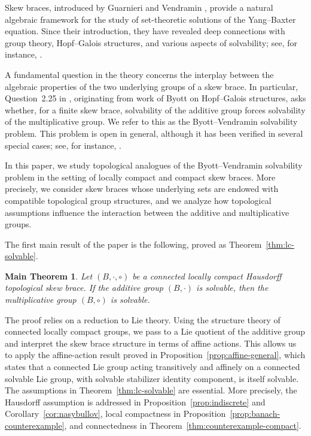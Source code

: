 \documentclass[reqno]{amsart}
\numberwithin{equation}{section}
\newtheorem*{maintheorem}{Main Theorem}
\theoremstyle{definition}
\theoremstyle{remark}
\begin{document}
Skew braces, introduced by Guarnieri and Vendramin \cite{Guarnieri2017},
provide a natural algebraic framework for the study of set-theoretic solutions
of the Yang--Baxter equation. Since their introduction, they have revealed deep
connections with group theory, Hopf--Galois structures, and various aspects of
solvability; see, for instance, \cite{Smoktunowicz2018,Nasybullov}.

A fundamental question in the theory concerns the interplay between the
algebraic properties of the two underlying groups of a skew brace. In
particular, Question~2.25 in \cite{Smoktunowicz2018}, originating from work of
Byott on Hopf--Galois structures, asks whether, for a finite skew brace,
solvability of the additive group forces solvability of the multiplicative
group. We refer to this as the Byott--Vendramin solvability problem. This
problem is open in general, although it has been verified in several special
cases; see, for instance, \cite{Nasybullov,GorshkovNasybullov}.

In this paper, we study topological analogues of the Byott--Vendramin
solvability problem in the setting of locally compact and compact skew braces.
More precisely, we consider skew braces whose underlying sets are endowed with
compatible topological group structures, and we analyze how topological
assumptions influence the interaction between the additive and multiplicative
groups.

The first main result of the paper is the following, proved as
Theorem~\ref{thm:lc-solvable}.

\begin{maintheorem}
Let $(B,\cdot,\circ)$ be a connected locally compact Hausdorff topological skew
brace. If the additive group $(B,\cdot)$ is solvable, then the multiplicative
group $(B,\circ)$ is solvable.
\end{maintheorem}

The proof relies on a reduction to Lie theory. Using the structure theory of
connected locally compact groups, we pass to a Lie quotient of the additive
group and interpret the skew brace structure in terms of affine actions. 
This allows us to apply the affine-action result proved in
Proposition~\ref{prop:affine-general}, which states that a connected Lie group
acting transitively and affinely on a connected solvable Lie group, with
solvable stabilizer identity component, is itself solvable.
The assumptions in Theorem~\ref{thm:lc-solvable} are essential. More precisely,
the Hausdorff assumption is addressed in Proposition~\ref{prop:indiscrete} and
Corollary~\ref{cor:nasybullov}, local compactness in
Proposition~\ref{prop:banach-counterexample}, and connectedness in
Theorem~\ref{thm:counterexample-compact}.
\end{document}
